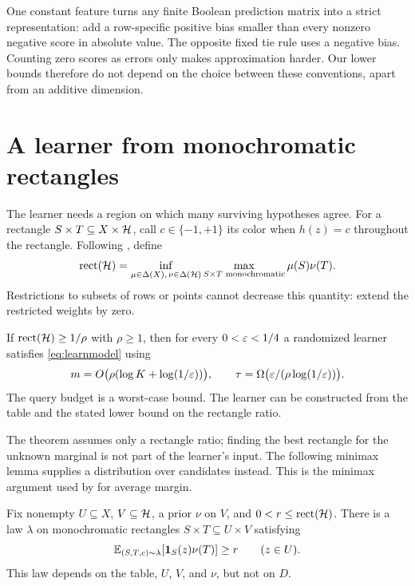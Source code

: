 \begin{remark}\label{rem:ties}
One constant feature turns any finite Boolean prediction matrix into a strict representation: add a row-specific positive bias smaller than every nonzero negative score in absolute value. The opposite fixed tie rule uses a negative bias. Counting zero scores as errors only makes approximation harder. Our lower bounds therefore do not depend on the choice between these conventions, apart from an additive dimension.
\end{remark}

\section{A learner from monochromatic rectangles}\label{sec:rectangle}
The learner needs a region on which many surviving hypotheses agree. For a rectangle $S\times T\subseteq X\times\mathcal H$, call $c\in\{-1,+1\}$ its color when $h(z)=c$ throughout the rectangle. Following \citet{HHPTZ22}, define
\begin{equation}
 \operatorname{rect}(\mathcal H)=\inf_{\mu\in\Delta(X),\,\nu\in\Delta(\mathcal H)}
 \max_{S\times T\text{ monochromatic}}\mu(S)\nu(T).
 \label{eq:rectdef}
\end{equation}
Restrictions to subsets of rows or points cannot decrease this quantity: extend the restricted weights by zero.

\begin{theorem}\label{thm:rectangle}
If $\operatorname{rect}(\mathcal H)\ge1/\rho$ with $\rho\ge1$, then for every $0<\varepsilon<1/4$ a randomized learner satisfies \eqref{eq:learnmodel} using
\begin{equation}
 m=O\bigl(\rho(\log K+\log(1/\varepsilon))\bigr),
 \qquad \tau=\Omega\bigl(\varepsilon/(\rho\log(1/\varepsilon))\bigr).
 \label{eq:rectanglebound}
\end{equation}
The query budget is a worst-case bound. The learner can be constructed from the table and the stated lower bound on the rectangle ratio.
\end{theorem}

The theorem assumes only a rectangle ratio; finding the best rectangle for the unknown marginal is not part of the learner's input. The following minimax lemma supplies a distribution over candidates instead. This is the minimax argument used by \citet{HHPTZ22} for average margin.

\begin{lemma}\label{lem:mixture}
Fix nonempty $U\subseteq X$, $V\subseteq\mathcal H$, a prior $\nu$ on $V$, and $0<r\le\operatorname{rect}(\mathcal H)$. There is a law $\lambda$ on monochromatic rectangles $S\times T\subseteq U\times V$ satisfying
\begin{equation}
 \mathbb E_{(S,T,c)\sim\lambda}[\mathbf 1_S(z)\nu(T)]\ge r
 \qquad(z\in U).
 \label{eq:pointwise}
\end{equation}
This law depends on the table, $U$, $V$, and $\nu$, but not on $D$.
\end{lemma}

